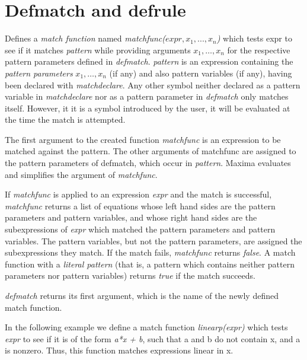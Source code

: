\documentclass[../Maxima_Workbook.tex]{subfiles}
\begin{document}
\section{Defmatch and defrule}

 \hfill \tcr{[function]}

\lz Defines a \emph{match function} named \emph{matchfunc($expr, x_1, ..., x_n$)} which tests expr to see if it matches \emph{pattern} while providing arguments $ x_1,\dots, x_n $ for the respective pattern parameters defined in \emph{defmatch}. \emph{pattern} is an expression containing the \emph{pattern parameters} $ x_1,\dots, x_n $ (if any) and also pattern variables (if any), having been declared with \emph{matchdeclare}. Any other symbol neither declared as a pattern variable in \emph{matchdeclare} nor as a pattern parameter in \emph{defmatch} only matches itself. However, it it is a symbol introduced by the user, it will be evaluated at the time the match is attempted.

\lz The first argument to the created function \emph{matchfunc} is an expression to be matched against the pattern. The other arguments of matchfunc are assigned to the pattern parameters of defmatch, which occur in \emph{pattern}. Maxima evaluates and simplifies the argument of \emph{matchfunc}. 

\lz If \emph{matchfunc} is applied to an expression \emph{expr} and the match is successful, \emph{matchfunc} returns a list of equations whose left hand sides are the pattern parameters and pattern variables, and whose right hand sides are the subexpressions of \emph{expr} which matched the pattern parameters and pattern variables. The pattern variables, but not the pattern parameters, are assigned the subexpressions they match. If the match fails, \emph{matchfunc} returns \emph{false}. A match function with a \emph{literal pattern} (that is, a pattern which contains neither pattern parameters nor pattern variables) returns \emph{true} if the match succeeds.

\lz \emph{defmatch} returns its first argument, which is the name of the newly defined match function.

\lz In the following example we define a match function \emph{linearp(expr)} which tests \emph{expr} to see if it is of the form \emph{a*x + b}, such that a and b do not contain x, and a is nonzero. Thus, this function matches expressions linear in x.
\end{document}
